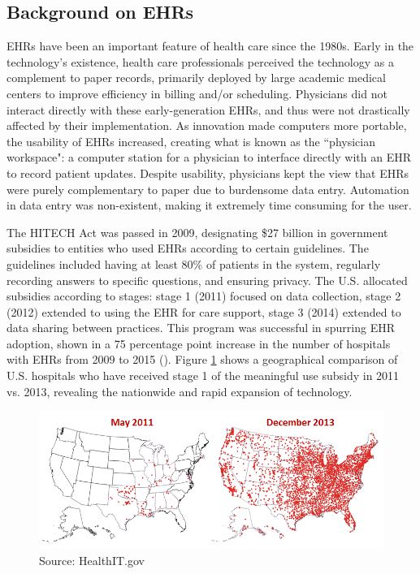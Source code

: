 \documentclass[12pt]{article}
\begin{document}
\subsection{Background on EHRs}
EHRs have been an important feature of health care since the 1980s. Early in the technology's existence, health care professionals perceived the technology as a complement to paper records, primarily deployed by large academic medical centers to improve efficiency in billing and/or scheduling. Physicians did not interact directly with these early-generation EHRs, and thus were not drastically affected by their implementation. As innovation made computers more portable, the usability of EHRs increased, creating what is known as the ``physician workspace": a computer station for a physician to interface directly with an EHR to record patient updates. Despite usability, physicians kept the view that EHRs were purely complementary to paper due to burdensome data entry. Automation in data entry was non-existent, making it extremely time consuming for the user. 

The HITECH Act was passed in 2009, designating \$27 billion in government subsidies to entities who used EHRs according to certain guidelines. The guidelines included having at least 80\% of patients in the system, regularly recording answers to specific questions, and ensuring privacy. The U.S. allocated subsidies according to stages: stage 1 (2011) focused on data collection, stage 2 (2012) extended to using the EHR for care support, stage 3 (2014) extended to data sharing between practices. This program was successful in  spurring EHR adoption, shown in a 75 percentage point increase in the number of hospitals with EHRs from 2009 to 2015 (\cite{stats}). Figure \ref{fig:meanuse} shows a geographical comparison of U.S. hospitals who have received stage 1 of the meaningful use subsidy in 2011 vs. 2013, revealing the nationwide and rapid expansion of technology. 

\begin{figure}[ht]
    \centering
    \captionsetup{width=.6\linewidth}
    \caption{Hospitals Receiving Meaningful Use Stage 1 Subsidy}
    \includegraphics[scale=.6]{graphics/QS-Hospitals-Receiving-Payments-for-MU-and-Adoption.png}
    \caption*{Source: HealthIT.gov}
    \label{fig:meanuse}
\end{figure}
\end{document}

